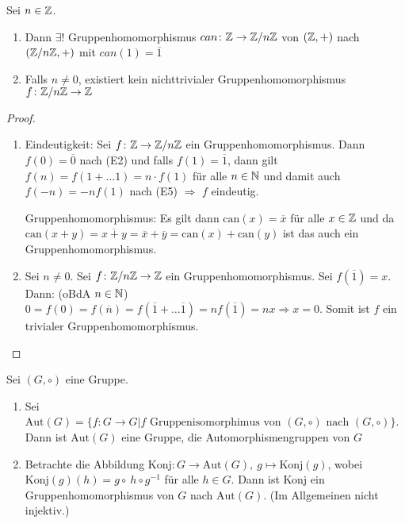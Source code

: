 \documentclass[12pt,a4paper]{scrartcl}
\begin{document}
\begin{lem}
	Sei $n\in \mathbb Z$.
	\begin{enumerate}
		\item Dann $\exists!$ Gruppenhomomorphismus $can\colon \mathbb Z\to \mathbb Z/n\mathbb Z$ von $(\mathbb Z,+)$ nach $(\mathbb Z/n\mathbb Z,+)$ mit $can(1)=\overline{1}$
		\item Falls $n\neq 0$, existiert kein nichttrivialer Gruppenhomomorphismus $f\colon \mathbb Z/n\mathbb Z\to\mathbb Z$ 
	\end{enumerate}
\end{lem}
\begin{proof}
	\leavevmode
	\begin{enumerate}
		\item
	Eindeutigkeit: Sei $f\colon \mathbb Z\to \mathbb Z/n\mathbb Z$ ein Gruppenhomomorphismus. Dann $f(0)=\overline{0}$ nach (E2) und falls $f(1) = \overline{1}$, dann gilt $f(n)= f(1+\dots 1) = n\cdot f(1)$ für alle $n\in\mathbb N$ und damit auch $f(-n) = -nf(1)$ nach (E5) $\Rightarrow$ $f$ eindeutig.
	
	\noindent Gruppenhomomorphismus: Es gilt dann $\text{can}(x) = \overline{x}$ für alle $x\in\mathbb Z$ und da $\text{can}(x+y) = \overline{x+y} = \overline{x}+\overline{y} = \text{can}(x)+\text{can}(y)$ ist das auch ein Gruppenhomomorphismus.
	
	\item Sei $n\neq 0$. Sei $f\colon \mathbb Z/n\mathbb Z\to \mathbb Z$ ein Gruppenhomomorphismus. Sei $f(\overline{1})= x$. Dann: (oBdA $n\in\mathbb N$) $0=f(0)=f(\overline{n})= f(\overline{1}+\dots \overline{1})=nf(\overline{1})= nx\Rightarrow x=0$. Somit ist $f$ ein trivialer Gruppenhomomorphismus.
	\end{enumerate}
\end{proof}

\begin{lem}
	Sei $(G,\circ)$ eine Gruppe.
	\begin{enumerate}
		\item Sei $\text{Aut}(G) = \{f\colon G\to G| f \text{ Gruppenisomorphimus von $(G,\circ)$ nach }(G,\circ)\}$. Dann ist $\text{Aut}(G)$ eine Gruppe, die Automorphismengruppen von $G$
		\item Betrachte die Abbildung $\text{Konj}\colon G\to \text{Aut}(G) ,\ g\mapsto \text{Konj}(g)$, wobei $\text{Konj}(g)(h)= g\circ\ h\circ g^{-1}$ für alle $h\in G$. Dann ist Konj ein Gruppenhomomorphismus von $G$ nach $\text{Aut}(G)$. (Im Allgemeinen nicht injektiv.)
	\end{enumerate}
\end{lem}
\end{document}
